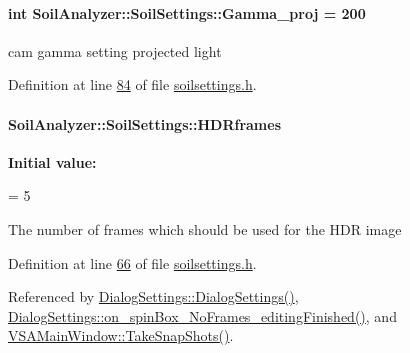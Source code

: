 \hypertarget{class_soil_analyzer_1_1_soil_settings_a1d66dc760c4b2f857f8660d60c257b71}{}
\paragraph[{Gamma\+\_\+proj}]{\setlength{\rightskip}{0pt plus 5cm}int Soil\+Analyzer\+::\+Soil\+Settings\+::\+Gamma\+\_\+proj = 200}\label{class_soil_analyzer_1_1_soil_settings_a1d66dc760c4b2f857f8660d60c257b71}
cam gamma setting projected light 

Definition at line \hyperlink{soilsettings_8h_source_l00084}{84} of file \hyperlink{soilsettings_8h_source}{soilsettings.\+h}.

\hypertarget{class_soil_analyzer_1_1_soil_settings_a77e631ff44efe74762b5adaa2eb2cd11}{}
\paragraph[{H\+D\+Rframes}]{ Soil\+Analyzer\+::\+Soil\+Settings\+::\+H\+D\+Rframes}\label{class_soil_analyzer_1_1_soil_settings_a77e631ff44efe74762b5adaa2eb2cd11}
{\bfseries Initial value\+:}
\begin{DoxyCode}
=
      5
\end{DoxyCode}
The number of frames which should be used for the H\+D\+R image 

Definition at line \hyperlink{soilsettings_8h_source_l00066}{66} of file \hyperlink{soilsettings_8h_source}{soilsettings.\+h}.



Referenced by \hyperlink{dialogsettings_8cpp_source_l00005}{Dialog\+Settings\+::\+Dialog\+Settings()}, \hyperlink{dialogsettings_8cpp_source_l00286}{Dialog\+Settings\+::on\+\_\+spin\+Box\+\_\+\+No\+Frames\+\_\+editing\+Finished()}, and \hyperlink{vsamainwindow_8cpp_source_l00391}{V\+S\+A\+Main\+Window\+::\+Take\+Snap\+Shots()}.

\hypertarget{class_soil_analyzer_1_1_soil_settings_a85e56e16b6faa940d4a8f36c9a19d14c}{}
